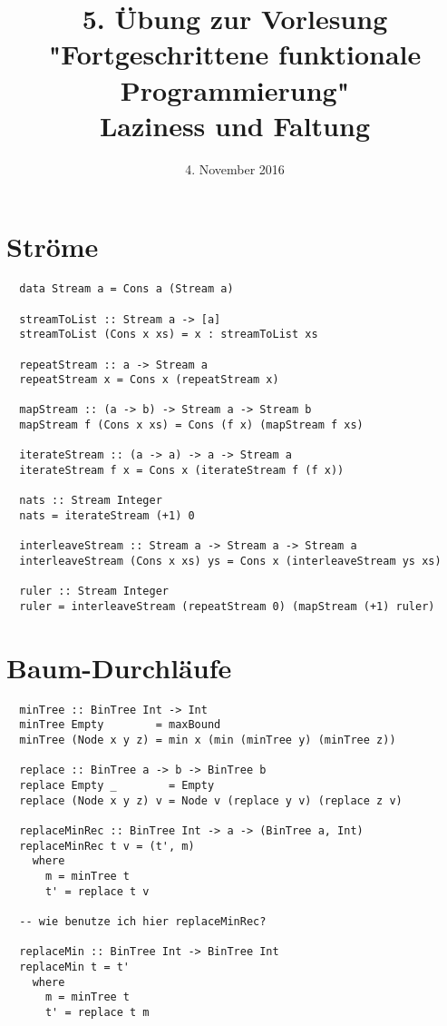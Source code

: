 \documentclass[a4paper]{article}
\title{\small{5. Übung zur Vorlesung "Fortgeschrittene funktionale Programmierung"}\\\vspace{.5cm}\huge{Laziness und Faltung}}
\date{4. November 2016}
\begin{document}
\maketitle

\section{Ströme}

\begin{lstlisting}
  data Stream a = Cons a (Stream a)

  streamToList :: Stream a -> [a]
  streamToList (Cons x xs) = x : streamToList xs

  repeatStream :: a -> Stream a
  repeatStream x = Cons x (repeatStream x)

  mapStream :: (a -> b) -> Stream a -> Stream b
  mapStream f (Cons x xs) = Cons (f x) (mapStream f xs)

  iterateStream :: (a -> a) -> a -> Stream a
  iterateStream f x = Cons x (iterateStream f (f x))

  nats :: Stream Integer
  nats = iterateStream (+1) 0

  interleaveStream :: Stream a -> Stream a -> Stream a
  interleaveStream (Cons x xs) ys = Cons x (interleaveStream ys xs)

  ruler :: Stream Integer
  ruler = interleaveStream (repeatStream 0) (mapStream (+1) ruler)
\end{lstlisting}

\pagebreak

\section{Baum-Durchläufe}

\begin{lstlisting}
  minTree :: BinTree Int -> Int
  minTree Empty        = maxBound
  minTree (Node x y z) = min x (min (minTree y) (minTree z))

  replace :: BinTree a -> b -> BinTree b
  replace Empty _        = Empty
  replace (Node x y z) v = Node v (replace y v) (replace z v)

  replaceMinRec :: BinTree Int -> a -> (BinTree a, Int)
  replaceMinRec t v = (t', m)
    where
      m = minTree t
      t' = replace t v

  -- wie benutze ich hier replaceMinRec?

  replaceMin :: BinTree Int -> BinTree Int
  replaceMin t = t'
    where
      m = minTree t
      t' = replace t m
\end{lstlisting}
\end{document}
